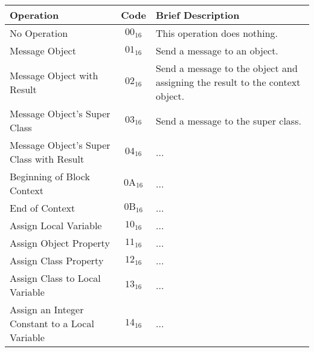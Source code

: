 \begin{center}
  \begin{tabular}{ | p{6cm} | c | p{8cm} | }
  	\hline
  	Operation                                      & Code               & Brief Description                                                                \\ \hline
  	No Operation                                   & $00_{16}$          & This operation does nothing.                                                     \\
  	Message Object                                 & $01_{16}$          & Send a message to an object.                                                     \\
  	Message Object with Result                     & $02_{16}$          & Send a message to the object
    and assigning the result to the context object. \\
  	Message Object's Super Class                   & $03_{16}$          & Send a message to the super class.                                           \\
  	Message Object's Super Class with Result       & $04_{16}$          & ...                                                                              \\
  	Beginning of Block Context                     & $\mathrm{0A}_{16}$ & ...                                                                              \\
  	End of Context                                 & $\mathrm{0B}_{16}$ & ...                                                                              \\
  	Assign Local Variable                          & $10_{16}$          & ...                                                                              \\
  	Assign Object Property                         & $11_{16}$          & ...                                                                              \\
  	Assign Class Property                          & $12_{16}$          & ...                                                                              \\
  	Assign Class to Local Variable                 & $13_{16}$          & ...                                                                              \\
  	Assign an Integer Constant to a Local Variable & $14_{16}$          & ...                                                                              \\ \hline
  \end{tabular}
\end{center}

